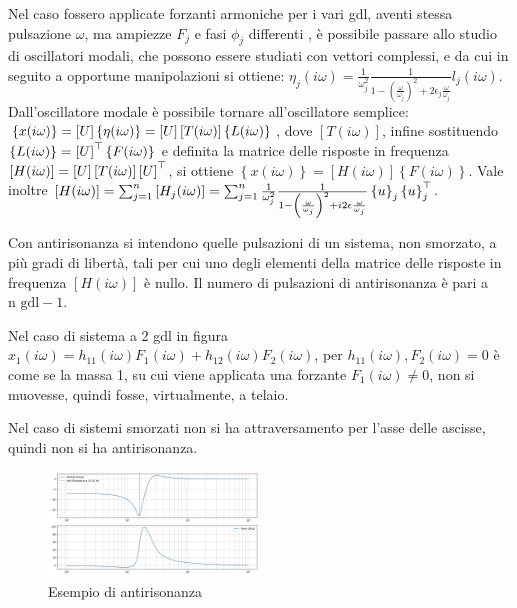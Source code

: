 Nel caso fossero applicate forzanti armoniche per i vari gdl, aventi stessa pulsazione \(\omega\), ma ampiezze \(F_j\) e fasi \(\phi_j\) differenti , è possibile passare allo studio di oscillatori modali, che possono essere studiati con vettori complessi, e da cui in seguito a opportune manipolazioni  si ottiene: \(\eta_j(i\omega) = \frac{1}{\omega_j^2} \frac{1}{1-\left(\frac{\omega}{\omega_j}\right)^2 + 2\epsilon_j \frac{\omega}{\omega_j}} l_j(i\omega)\).
Dall'oscillatore modale è possibile tornare all'oscillatore semplice: \(\left\{ x(i\omega) \right\} = \left[ U \right] \left\{ \eta(i\omega) \right\} = \left[ U \right] \left[ T(i\omega) \right] \left\{ L(i\omega) \right\} \), dove \(\left[ T(i\omega) \right]\), infine sostituendo \(\left\{ L(i\omega) \right\} = \left[ U \right]^\top \left\{ F(i\omega) \right\}\) e definita la matrice delle risposte in frequenza \( \left[ H(i\omega) \right] = \left[ U \right] \left[ T(i\omega) \right] \left[ U \right]^\top \), si ottiene \( \left\{ x(i\omega) \right\} = \left[ H(i\omega) \right] \left\{ F(i\omega) \right\} \).
Vale inoltre \(\left[ H(i\omega) \right] = \sum^n_{j=1} \left[ H_j(i\omega) \right] = \sum^n_{j=1} \frac{1}{\omega^2_j} \frac{1}{1-\left(\frac{\omega}{\omega_j}\right)^2 + i2 \epsilon \frac{\omega}{\omega_j}} \left\{ u \right\}_j \left\{ u \right\}_j^\top \).



Con antirisonanza si intendono quelle pulsazioni di un sistema, non smorzato, a più gradi di libertà, tali per cui uno degli elementi della matrice delle risposte in frequenza \(\left[ H(i\omega) \right]\) è nullo.
Il numero di pulsazioni di antirisonanza è pari a \(\text{n gdl} - 1\).

Nel caso di sistema a 2 gdl in figura  \( x_1(i\omega) = h_{11}(i\omega) F_1(i\omega) + h_{12}(i\omega)F_2(i\omega) \), per \( h_{11}(i\omega), F_2(i\omega) = 0\) è come se la massa 1, su cui viene applicata una forzante \(F_1(i\omega)\neq 0\), non si muovesse, quindi fosse, virtualmente, a telaio.

Nel caso di sistemi smorzati non si ha attraversamento per l'asse delle ascisse, quindi non si ha antirisonanza.

\begin{figure}[h]
    \centering
    \includegraphics[width=0.5\textwidth]{Immagini/esempio_antirisonanza.png}
    \caption{Esempio di antirisonanza}
\end{figure}



